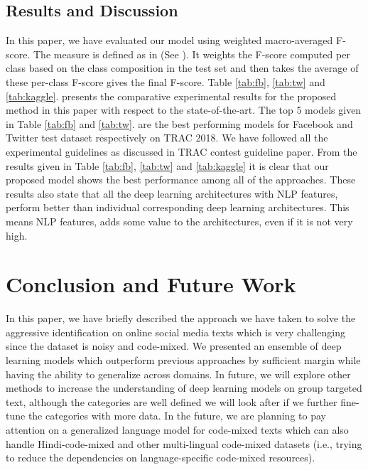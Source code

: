 \documentclass[sigconf]{acmart}
\begin{document}
\subsection{Results and Discussion}\label{results}
In this paper, we have evaluated our model using weighted macro-averaged F-score. The measure is defined as in (See \cite{kumar2018proceedings, kumar2018trac}). It weights the F-score computed per class based on the class composition in the test set and then takes the average of these per-class F-score gives the final F-score. Table \ref{tab:fb}, \ref{tab:tw} and \ref{tab:kaggle}. presents the comparative experimental results for the proposed method in this paper with respect to the state-of-the-art. The top 5 models\cite{kumar2018proceedings} given in Table \ref{tab:fb} and \ref{tab:tw}. are the best performing models for Facebook and Twitter test dataset respectively on TRAC 2018. We have followed all the experimental guidelines as discussed in TRAC contest guideline paper\cite{kumar2018trac, kumar2018proceedings}. From the results given in Table \ref{tab:fb}, \ref{tab:tw} and \ref{tab:kaggle} it is clear that our proposed model shows the best performance among all of the approaches. These results also state that all the deep learning architectures with NLP features, perform better than individual corresponding deep learning architectures. This means NLP features, adds some value to the architectures, even if it is not very high.
\vspace{-1mm}
\section{Conclusion and Future Work}\label{conclusion}
In this paper, we have briefly described the approach we have taken to solve the aggressive identification on online social media texts which is very challenging since the dataset is noisy and code-mixed. We presented an ensemble of deep learning models which outperform previous approaches by sufficient margin while having the ability to generalize across domains. 
\newline In future, we will explore other methods to increase the understanding of deep learning models on group targeted text, although the categories are well defined we will look after if we further fine-tune the categories with more data. In the future, we are planning to pay attention on a generalized language model for code-mixed texts which can also handle Hindi-code-mixed and other multi-lingual code-mixed datasets (i.e., trying to reduce the dependencies on language-specific code-mixed resources). 


\end{document}
